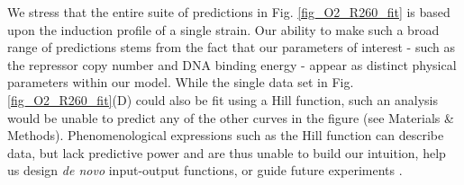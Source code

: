 We stress that the entire suite of predictions in Fig. \ref{fig_O2_R260_fit} is
based upon the induction profile of a single strain. Our ability to make such a
broad range of predictions stems from the fact that our parameters of interest -
such as the repressor copy number and DNA binding energy - appear as distinct
physical parameters within our model. While the single data set in
Fig. \ref{fig_O2_R260_fit}(D) could also be fit using a Hill function, such
an analysis would be unable to predict any of the other curves in the figure
(see Materials \& Methods).
Phenomenological expressions such as the Hill function can describe data, but
lack predictive power and are thus unable to build our intuition, help us design
\textit{de novo} input-output functions, or guide future experiments
\cite{Kuhlman2007, Murphy2007}.

